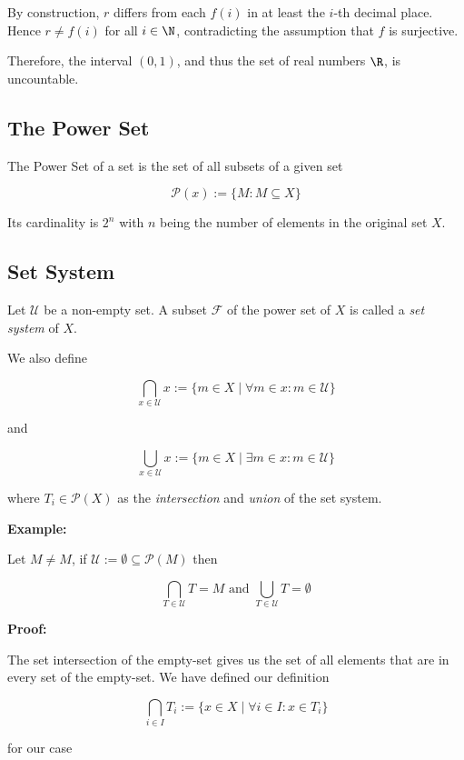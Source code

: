 By construction, \( r \) differs from each \( f(i) \) in at least the \( i \)-th decimal place.  
Hence \( r \neq f(i) \) for all \( i \in \N \), contradicting the assumption that \( f \) is surjective.

Therefore, the interval \( (0,1) \), and thus the set of real numbers \( \R \), is uncountable.

\QED 

\subsection{The Power Set}

The Power Set of a set is the set of all subsets of a given set 

\[
	\mathcal{P}(x):= \{ M: M \subseteq X\}
\]

Its cardinality is \(2^n\) with \(n\) being the number of elements in the original set \(X\).

\subsection{Set System}

Let \(\mathcal{U}\) be a non-empty set. A subset \(\mathscr{F}\) of the power set of \(X\) is called a 
\emph{set system} of \(X\). 

We also define 

\[
	\bigcap_{x \in \mathcal{U}} x := \{m \in X \mid \forall m \in x: m \in \mathcal{U}\}
\]

and 

\[
	\bigcup_{x \in \mathcal{U}} x := \{m \in X \mid \exists m \in x: m \in \mathcal{U}\}
\]

where \(T_i \in \mathcal{P}(X)\) as the \emph{intersection} and \emph{union} of the set system.

\textbf{Example:}

Let \(M \neq M\), if \(\mathcal{U} :=  \emptyset \subseteq \mathcal{P}(M)\) then 

\[
	\bigcap_{T \in \mathcal{U}} T = M \text{ and } \bigcup_{T \in \mathcal{U}} T = \emptyset
\]

\textbf{Proof:}

The set intersection of the empty-set gives us the set of all elements that are in every set of the empty-set. 
We have defined our definition 

\[
	\bigcap_{i \in I} T_i := \{x \in X \mid \forall i \in I: x \in T_i\}
\]

for our case 

